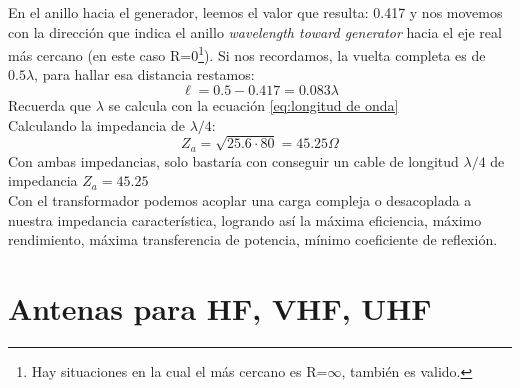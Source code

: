 \documentclass[
	12pt, %
	fleqn, %
	a4paper, %
	oneside, %
]{LegrandOrangeBook}
\begin{document}
\begin{example}[Se tiene una $Z_L=32-\iu 40$ con una impedancia característica de $80\Omega$. Diseñe la adaptación por $\lambda/4$.]
\begin{center}
\end{center}
En el anillo hacia el generador, leemos el valor que resulta: 0.417 y nos movemos con la dirección que indica el anillo \textit{wavelength toward generator} hacia el eje real más cercano (en este caso R=0\footnote{Hay situaciones en la cual el más cercano es R=$\infty$, también es valido.}). Si nos recordamos, la vuelta completa es de $0.5\lambda$, para hallar esa distancia restamos:
\begin{displaymath}
\ell=0.5-0.417=0.083\lambda
\end{displaymath}
Recuerda que $\lambda$ se calcula con la ecuación \ref{eq:longitud de onda}\\
Calculando la impedancia de $\lambda/4$:
\begin{displaymath}
Z_a=\sqrt{25.6\cdot 80}=45.25\Omega
\end{displaymath}
Con ambas impedancias, solo bastaría con conseguir un cable de longitud $\lambda/4$ de impedancia $Z_a=45.25$\\
Con el transformador podemos acoplar una carga compleja o desacoplada a nuestra impedancia característica, logrando así la máxima eficiencia, máximo rendimiento, máxima transferencia de potencia, mínimo coeficiente de reflexión.
\end{example}
\chapter{Antenas para HF, VHF, UHF}
\end{document}
